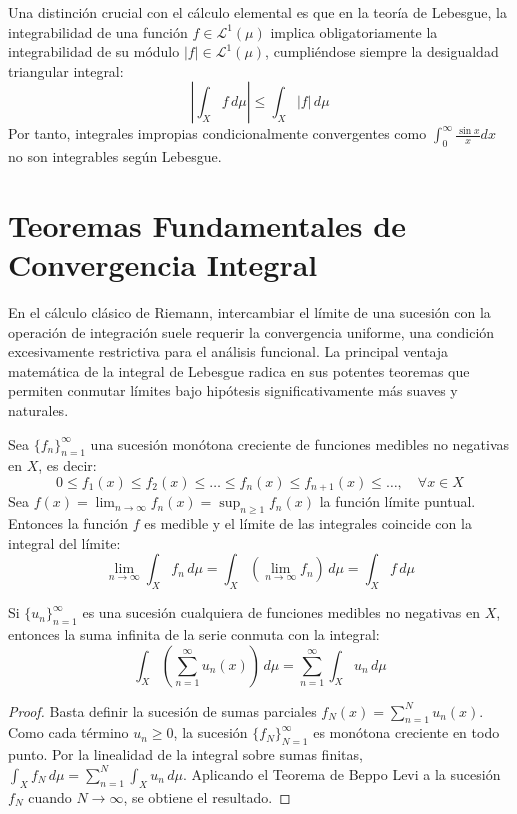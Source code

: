 \begin{observacion}
	Una distinción crucial con el cálculo elemental es que en la teoría de Lebesgue, la integrabilidad de una función $f \in \mathcal{L}^1(\mu)$ implica obligatoriamente la integrabilidad de su módulo $|f| \in \mathcal{L}^1(\mu)$, cumpliéndose siempre la desigualdad triangular integral:
	$$ \left| \int_X f \, d\mu \right| \le \int_X |f| \, d\mu $$
	Por tanto, integrales impropias condicionalmente convergentes como $\int_0^\infty \frac{\sin x}{x} dx$ no son integrables según Lebesgue.
\end{observacion}

\section{Teoremas Fundamentales de Convergencia Integral}

En el cálculo clásico de Riemann, intercambiar el límite de una sucesión con la operación de integración suele requerir la convergencia uniforme, una condición excesivamente restrictiva para el análisis funcional. La principal ventaja matemática de la integral de Lebesgue radica en sus potentes teoremas que permiten conmutar límites bajo hipótesis significativamente más suaves y naturales.

\begin{teorema}
	Sea $\{f_n\}_{n=1}^\infty$ una sucesión monótona creciente de funciones medibles no negativas en $X$, es decir:
	$$ 0 \le f_1(x) \le f_2(x) \le \dots \le f_n(x) \le f_{n+1}(x) \le \dots, \quad \forall x \in X $$
	Sea $f(x) = \lim_{n \to \infty} f_n(x) = \sup_{n \ge 1} f_n(x)$ la función límite puntual. Entonces la función $f$ es medible y el límite de las integrales coincide con la integral del límite:
	$$ \lim_{n \to \infty} \int_X f_n \, d\mu = \int_X \left( \lim_{n \to \infty} f_n \right) \, d\mu = \int_X f \, d\mu $$
\end{teorema}

\begin{corolario}
	Si $\{u_n\}_{n=1}^\infty$ es una sucesión cualquiera de funciones medibles no negativas en $X$, entonces la suma infinita de la serie conmuta con la integral:
	$$ \int_X \left( \sum_{n=1}^\infty u_n(x) \right) \, d\mu = \sum_{n=1}^\infty \int_X u_n \, d\mu $$
\end{corolario}
\begin{proof}
	Basta definir la sucesión de sumas parciales $f_N(x) = \sum_{n=1}^N u_n(x)$. Como cada término $u_n \ge 0$, la sucesión $\{f_N\}_{N=1}^\infty$ es monótona creciente en todo punto. Por la linealidad de la integral sobre sumas finitas, $\int_X f_N \, d\mu = \sum_{n=1}^N \int_X u_n \, d\mu$. Aplicando el Teorema de Beppo Levi a la sucesión $f_N$ cuando $N \to \infty$, se obtiene el resultado.
\end{proof}

